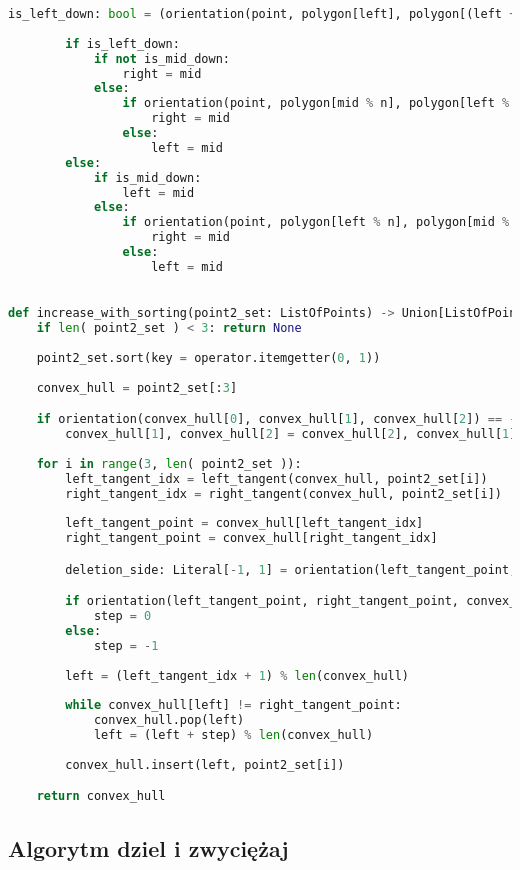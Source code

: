 \documentclass[11pt]{article}
\theoremstyle{remark} \newtheorem{definition}{def.}
\theoremstyle{definition} \newtheorem{twierdzenie}{tw.}
\begin{document}
\begin{lstlisting}[language=Python]
        is_left_down: bool = (orientation(point, polygon[left], polygon[(left + 1) % n]) == 1)
        
        if is_left_down:
            if not is_mid_down:
                right = mid
            else:
                if orientation(point, polygon[mid % n], polygon[left % n]) == 1:
                    right = mid
                else:
                    left = mid
        else:
            if is_mid_down:
                left = mid
            else:
                if orientation(point, polygon[left % n], polygon[mid % n]) == 1:
                    right = mid
                else:
                    left = mid

        
def increase_with_sorting(point2_set: ListOfPoints) -> Union[ListOfPoints, None]:
    if len( point2_set ) < 3: return None
    
    point2_set.sort(key = operator.itemgetter(0, 1))
    
    convex_hull = point2_set[:3]

    if orientation(convex_hull[0], convex_hull[1], convex_hull[2]) == -1:
        convex_hull[1], convex_hull[2] = convex_hull[2], convex_hull[1]
    
    for i in range(3, len( point2_set )):
        left_tangent_idx = left_tangent(convex_hull, point2_set[i])
        right_tangent_idx = right_tangent(convex_hull, point2_set[i])
        
        left_tangent_point = convex_hull[left_tangent_idx]
        right_tangent_point = convex_hull[right_tangent_idx]        

        deletion_side: Literal[-1, 1] = orientation(left_tangent_point, right_tangent_point, point2_set[i])

        if orientation(left_tangent_point, right_tangent_point, convex_hull[(left_tangent_idx + 1) % len(convex_hull)]) == deletion_side:
            step = 0
        else: 
            step = -1
            
        left = (left_tangent_idx + 1) % len(convex_hull)
        
        while convex_hull[left] != right_tangent_point:
            convex_hull.pop(left)
            left = (left + step) % len(convex_hull)
            
        convex_hull.insert(left, point2_set[i])

    return convex_hull
\end{lstlisting}

\subsection{Algorytm dziel i zwyciężaj}
\end{document}

